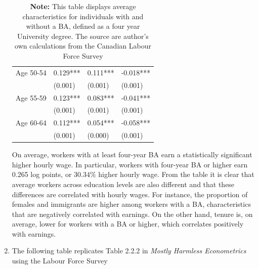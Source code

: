 \documentclass[letterpaper,12pt]{article}
\theoremstyle{dotlessS}
\begin{document}
\begin{enumerate}[label=(\alph*)]
\begin{table}[H]
\begin{center}
{\begin{tabular}{llll}
Age 50-54   &       0.129***&       0.111***&      -0.018***\\
                    &     (0.001)   &     (0.001)   &     (0.001)   \\
Age 55-59   &       0.123***&       0.083***&      -0.041***\\
                    &     (0.001)   &     (0.001)   &     (0.001)   \\
Age 60-64   &       0.112***&       0.054***&      -0.058***\\
                    &     (0.001)   &     (0.000)   &     (0.001)   \\
\hline
\hline
\end{tabular}}
\end{center}
\captionsetup{width=0.80\textwidth}
\captionsetup{skip=0pt}
\caption*{\textbf{Note:} This table displays average characteristics for individuals with and without a BA, defined as a four year University degree. The source are author's own calculations from the Canadian Labour Force Survey }
\end{table}
On average, workers with at least  four-year BA earn a statistically significant higher hourly wage. In particular, workers with four-year BA or higher earn 0.265 log points, or $30.34\%$ higher hourly wage. From the table it is clear that average workers across education levels are also different and that these differences are correlated with hourly wages. For instance, the proportion of females and immigrants are higher among workers with a BA, characteristics that are negatively correlated with earnings. On the other hand, tenure is, on average, lower for workers with a BA or higher, which correlates positively with earnings.

\item The following table replicates Table 2.2.2 in \textit{Mostly Harmless Econometrics} using the Labour Force Survey


\end{enumerate}
\end{document}
